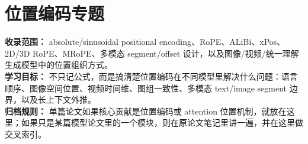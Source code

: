 
\section*{位置编码专题}
{}

\begin{conceptbox}
\textbf{收录范围：} absolute/sinusoidal positional encoding、RoPE、ALiBi、xPos、2D/3D RoPE、MRoPE、多模态 segment/offset 设计，以及图像/视频/统一理解生成模型中的位置组织方式。\\
\textbf{学习目标：} 不只记公式，而是搞清楚位置编码在不同模型里解决什么问题：语言顺序、图像空间位置、视频时间维、图组一致性、多模态 text/image segment 边界，以及长上下文外推。\\
\textbf{归档规则：} 单篇论文如果核心贡献是位置编码或 attention 位置机制，就放在这里；如果只是某篇模型论文里的一个模块，则在原论文笔记里讲一遍，并在这里做交叉索引。
\end{conceptbox}


